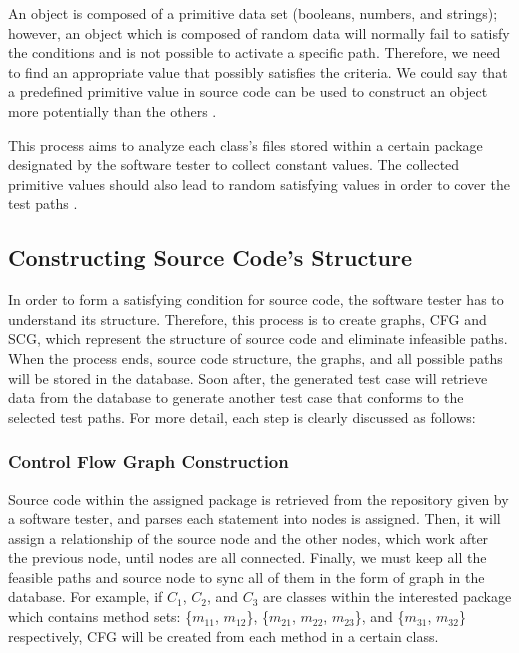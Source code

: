 An object is composed of a primitive data set (booleans, 
numbers, and strings); however, an object which is composed 
of random data will normally fail to satisfy the conditions 
and is not possible to activate a specific path. Therefore, 
we need to find an appropriate value that possibly satisfies 
the criteria. We could say that a predefined primitive value 
in source code can be used to construct an object more potentially 
than the others \cite{McCabe1976}.

This process aims to analyze each class’s files stored within 
a certain package designated by the software tester to collect 
constant values. The collected primitive values should 
also lead to random satisfying values in order to cover 
the test paths \cite{McCabe1976}.

\subsection{Constructing Source Code’s Structure}

In order to form a satisfying condition for source code, 
the software tester has to understand its structure. Therefore, 
this process is to create graphs, CFG and SCG, which represent 
the structure of source code and eliminate infeasible paths. 
When the process ends, source code structure, the graphs, 
and all possible paths will be stored in the database. 
Soon after, the generated test case will retrieve data 
from the database to generate another test case that conforms 
to the selected test paths. For more detail, each step 
is clearly discussed as follows:

\subsubsection{Control Flow Graph Construction}

Source code within the assigned package is retrieved from 
the repository given by a software tester, and parses each statement 
into nodes is assigned. Then, it will assign a relationship 
of the source node and the other nodes, which work after 
the previous node, until nodes are all connected. Finally, we must 
keep all the feasible paths and source node to sync all of them in 
the form of graph in the database. For example, if $C_1$, $C_2$, 
and $C_3$ are classes within the interested package which contains 
method sets: \{$m_{11}$, $m_{12}$\}, \{$m_{21}$, $m_{22}$, $m_{23}$\}, 
and \{$m_{31}$, $m_{32}$\} respectively, CFG will be created 
from each method in a certain class.

